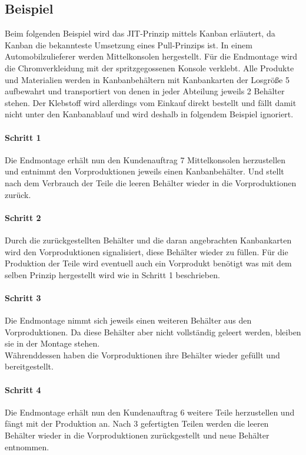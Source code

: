 \documentclass[00_ToyotaProduktionssystem.tex]{subfiles}
\begin{document}
\subsection{Beispiel}
Beim folgenden Beispiel wird das JIT-Prinzip mittels Kanban erläutert, da Kanban die bekannteste Umsetzung eines Pull-Prinzips ist.
In einem Automobilzulieferer werden Mittelkonsolen hergestellt. Für die Endmontage wird die Chromverkleidung mit der spritzgegossenen Konsole verklebt. Alle Produkte und Materialien werden in Kanbanbehältern mit Kanbankarten der Losgröße 5 aufbewahrt und transportiert von denen in jeder Abteilung jeweils 2 Behälter stehen. Der Klebstoff wird allerdings vom Einkauf direkt bestellt und fällt damit nicht unter den Kanbanablauf und wird deshalb in folgendem Beispiel ignoriert.

\paragraph{Schritt 1}
Die Endmontage erhält nun den Kundenauftrag 7 Mittelkonsolen herzustellen und entnimmt den Vorproduktionen jeweils einen Kanbanbehälter. Und stellt nach dem Verbrauch der Teile die leeren Behälter wieder in die Vorproduktionen zurück.

\paragraph{Schritt 2}
Durch die zurückgestellten Behälter und die daran angebrachten Kanbankarten wird den Vorproduktionen signalisiert, diese Behälter wieder zu füllen. Für die Produktion der Teile wird eventuell auch ein Vorprodukt benötigt was mit dem selben Prinzip hergestellt wird wie in Schritt 1 beschrieben.

\paragraph{Schritt 3}
Die Endmontage nimmt sich jeweils einen weiteren Behälter aus den Vorproduktionen. Da diese Behälter aber nicht vollständig geleert werden, bleiben sie in der Montage stehen.\\
Währenddessen haben die Vorproduktionen ihre Behälter wieder gefüllt und bereitgestellt.

\paragraph{Schritt 4}
Die Endmontage erhält nun den Kundenauftrag 6 weitere Teile herzustellen und fängt mit der Produktion an. Nach 3 gefertigten Teilen werden die leeren Behälter wieder in die Vorproduktionen zurückgestellt und neue Behälter entnommen.
\end{document}
